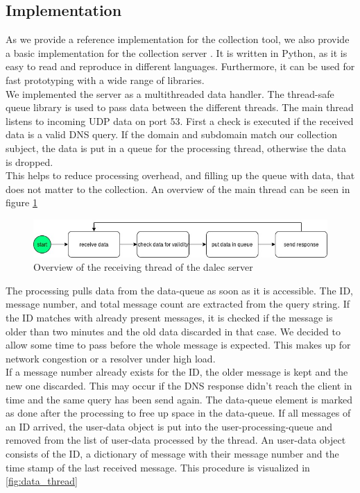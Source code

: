     \subsection{Implementation}
        \label{subsec:measure:implementation}
        As we provide a reference implementation for the collection tool, we also provide a basic implementation for the collection server \cite{venz_ikstreamdns-handler_2021}. It is written in Python, as it is easy to read and reproduce in different languages. Furthermore, it can be used for fast prototyping with a wide range of libraries.\\
        We implemented the server as a multithreaded data handler. The thread-safe queue library is used to pass data between the different threads. The main thread listens to incoming UDP data on port 53. First a check is executed if the received data is a valid DNS query. If the domain and subdomain match our collection subject, the data is put in a queue for the processing thread, otherwise the data is dropped.\\
        This helps to reduce processing overhead, and filling up the queue with data, that does not matter to the collection. An overview of the main thread can be seen in figure \ref{fig:main_thread}
        
        \begin{figure}[h]
            \centering
            \includegraphics[width=\textwidth]{latex/figures/main_threat.jpg}
            \caption{Overview of the receiving thread of the dalec server}
            \label{fig:main_thread}
        \end{figure}
        
        The processing pulls data from the data-queue as soon as it is accessible. The ID, message number, and total message count are extracted from the query string. 
        If the ID matches with already present messages, it is checked if the message is older than two minutes and the old data discarded in that case. We decided to allow some time to pass before the whole message is expected. This makes up for network congestion or a resolver under high load.\\
        If a message number already exists for the ID, the older message is kept and the new one discarded. This may occur if the DNS response didn't reach the client in time and the same query has been send again. The data-queue element is marked as done after the processing to free up space in the data-queue. If all messages of an ID arrived, the user-data object is put into the user-processing-queue and removed from the list of user-data processed by the thread.
        An user-data object consists of the ID, a dictionary of message with their message number and the time stamp of the last received message. This procedure is visualized in \ref{fig:data_thread}\\
        
